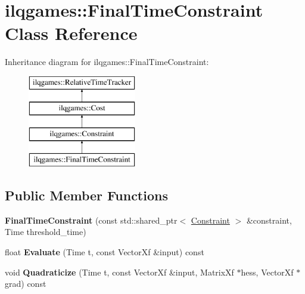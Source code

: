 \hypertarget{classilqgames_1_1_final_time_constraint}{}\section{ilqgames\+:\+:Final\+Time\+Constraint Class Reference}
\label{classilqgames_1_1_final_time_constraint}
Inheritance diagram for ilqgames\+:\+:Final\+Time\+Constraint\+:\begin{figure}[H]
\begin{center}
\leavevmode
\includegraphics[height=4.000000cm]{classilqgames_1_1_final_time_constraint}
\end{center}
\end{figure}
\subsection*{Public Member Functions}
\begin{DoxyCompactItemize}
\item 
{\bfseries Final\+Time\+Constraint} (const std\+::shared\+\_\+ptr$<$ \hyperlink{classilqgames_1_1_constraint}{Constraint} $>$ \&constraint, Time threshold\+\_\+time)\hypertarget{classilqgames_1_1_final_time_constraint_aae6e7c50e701b565624f0ba22c99e3ee}{}\label{classilqgames_1_1_final_time_constraint_aae6e7c50e701b565624f0ba22c99e3ee}

\item 
float {\bfseries Evaluate} (Time t, const Vector\+Xf \&input) const \hypertarget{classilqgames_1_1_final_time_constraint_abd415147fdd7a1a9bb587213f2b2a289}{}\label{classilqgames_1_1_final_time_constraint_abd415147fdd7a1a9bb587213f2b2a289}

\item 
void {\bfseries Quadraticize} (Time t, const Vector\+Xf \&input, Matrix\+Xf $\ast$hess, Vector\+Xf $\ast$grad) const \hypertarget{classilqgames_1_1_final_time_constraint_a4b1563c3564ba3a9b495ea352f133639}{}\label{classilqgames_1_1_final_time_constraint_a4b1563c3564ba3a9b495ea352f133639}

\end{DoxyCompactItemize}
